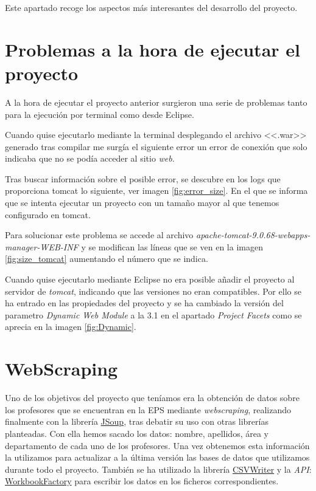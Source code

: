 
Este apartado recoge los aspectos más interesantes del desarrollo del proyecto.

\section{Problemas a la hora de ejecutar el proyecto}

A la hora de ejecutar el proyecto anterior surgieron una serie de problemas tanto para la ejecución por terminal como desde Eclipse.

Cuando quise ejecutarlo mediante la terminal desplegando el archivo <<.war>> generado tras compilar me surgía el siguiente error un error de conexión que solo indicaba que no se podía acceder al sitio \emph{web}.

Tras buscar información sobre el posible error, se descubre en los logs que proporciona tomcat lo siguiente, ver imagen \ref{fig:error_size}. En el que se informa que se intenta ejecutar un proyecto con un tamaño mayor al que tenemos configurado en tomcat.


Para solucionar este problema se accede al archivo \emph{apache-tomcat-9.0.68-webapps-manager-WEB-INF} y se modifican las líneas que se ven en la imagen \ref{fig:size_tomcat} aumentando el número que se indica.


Cuando quise ejecutarlo mediante Eclipse no era posible añadir el proyecto al servidor de \emph{tomcat}, indicando que las versiones no eran compatibles. Por ello se ha entrado en las propiedades del proyecto y se ha cambiado la versión del parametro \emph{Dynamic Web Module} a la 3.1 en el apartado \emph{Project Facets} como se aprecia en la imagen \ref{fig:Dynamic}.


\section{WebScraping}

Uno de los objetivos del proyecto que teníamos era la obtención de datos sobre los profesores que se encuentran en la EPS mediante \emph{webscraping}, realizando finalmente con la librería \href{https://jsoup.org/}{JSoup}, tras debatir su uso con otras librerías planteadas. 
Con ella hemos sacado los datos: nombre, apellidos, área y departamento de cada uno de los profesores. Una vez obtenemos esta información la utilizamos para actualizar a la última versión las bases de datos que utilizamos durante todo el proyecto.
También se ha utilizado la librería \href{https://opencsv.sourceforge.net/apidocs/com/opencsv/CSVWriter.html}{CSVWriter} y la \emph{API}: \href{https://poi.apache.org/apidocs/dev/org/apache/poi/ss/usermodel/WorkbookFactory.html}{WorkbookFactory} para escribir los datos en los ficheros correspondientes.

